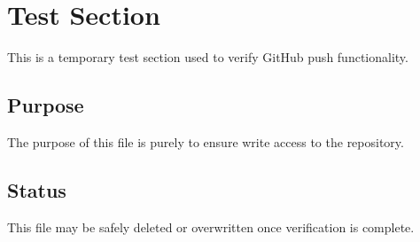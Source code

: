 \section{Test Section}
This is a temporary test section used to verify GitHub push functionality.

\subsection{Purpose}
The purpose of this file is purely to ensure write access to the repository.

\subsection{Status}
This file may be safely deleted or overwritten once verification is complete.